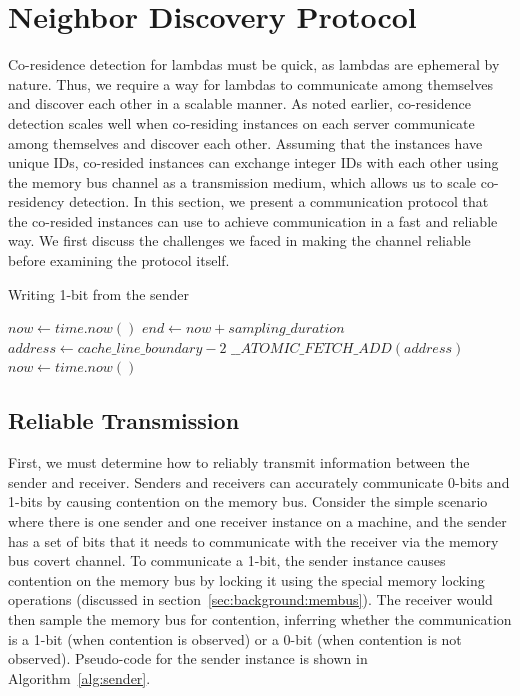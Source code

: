 \section{Neighbor Discovery Protocol}
\label{sec:technique}
 
Co-residence detection for lambdas must be quick, as lambdas
are ephemeral by nature. Thus, we require a way for lambdas to communicate among
themselves and discover each other in a scalable manner. 
As noted earlier, co-residence detection scales well when co-residing instances
on each server communicate among themselves and discover each other.  
Assuming that the instances have unique IDs, co-resided instances can exchange
integer IDs with each other using the memory bus channel as a transmission
medium, which allows us to scale co-residency detection.  In this section, we
present a communication protocol that the co-resided instances can use to
achieve communication in a fast and reliable way. We first discuss the
challenges we faced in making the channel reliable before examining the protocol
itself.

\begin{algorithm}[!t]
\caption{Writing 1-bit from the sender}
\label{alg:sender}
\begin{algorithmic}
\STATE $now \leftarrow  time.now()$
\STATE $end \leftarrow now + sampling\_duration$
\STATE $address \leftarrow cache\_line\_boundary-2$
    \STATE $\_\_ATOMIC\_FETCH\_ADD(address)$
    \STATE $now \leftarrow  time.now()$
\ENDWHILE
\end{algorithmic}
\end{algorithm}

\subsection{Reliable Transmission}
First, we must determine how to reliably transmit information between the sender
and receiver. Senders and receivers can accurately communicate 0-bits and 1-bits
by causing contention on the memory bus. Consider the simple scenario where
there is one sender and one receiver instance on a machine, and the sender has a
set of bits that it needs to communicate with the receiver via the memory bus
covert channel.  To communicate a 1-bit, the sender instance causes contention
on the memory bus by locking it using the special memory locking operations
(discussed in section~\ref{sec:background:membus}). The receiver would then
sample the memory bus for contention, inferring whether the communication is a
1-bit (when contention is observed) or a 0-bit (when contention is not
observed). Pseudo-code for the sender instance is shown in
Algorithm~\ref{alg:sender}.

